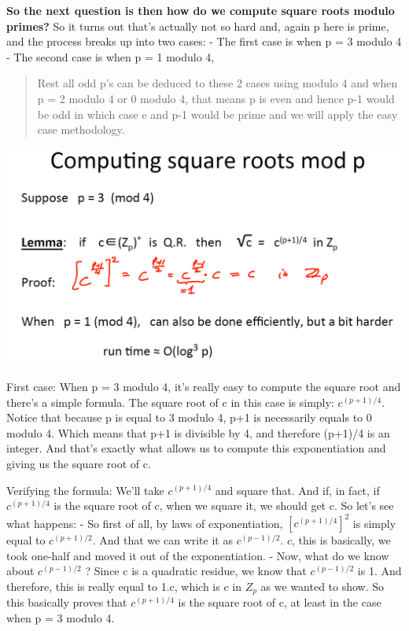 \documentclass[11pt]{article}
\makeatletter
\def\maxwidth{\ifdim\Gin@nat@width>\linewidth\linewidth
    \else\Gin@nat@width\fi}
\let\Oldincludegraphics\includegraphics
\renewcommand{\includegraphics}[1]{\Oldincludegraphics[width=.8\maxwidth]{#1}}
\makeatother
\begin{document}
\textbf{So the next question is then how do we compute square roots
modulo primes?} So it turns out that's actually not so hard and, again p
here is prime, and the process breaks up into two cases: - The first
case is when p = 3 modulo 4 - The second case is when p = 1 modulo 4,

\begin{quote}
Rest all odd p's can be deduced to these 2 cases using modulo 4 and when
p = 2 modulo 4 or 0 modulo 4, that means p is even and hence p-1 would
be odd in which case e and p-1 would be prime and we will apply the easy
case methodology.
\end{quote}

\includegraphics{./Images/NT-ComputeSqrRoot.png}

First case: When p = 3 modulo 4, it's really easy to compute the square
root and there's a simple formula. The square root of c in this case is
simply: \(c^{(p+1)/4}\). Notice that because p is equal to 3 modulo 4,
p+1 is necessarily equals to 0 modulo 4. Which means that p+1 is
divisible by 4, and therefore (p+1)/4 is an integer. And that's exactly
what allows us to compute this exponentiation and giving us the square
root of c.

Verifying the formula: We'll take \(c^{(p+1)/4}\) and square that. And
if, in fact, if \(c^{(p+1)/4}\) is the square root of c, when we square
it, we should get c. So let's see what happens: - So first of all, by
laws of exponentiation, \([c^{(p+1)/4}]^{2}\) is simply equal to
\(c^{(p+1)/2}\). And that we can write it as \(c^{(p-1)/2}\). \(c\),
this is basically, we took one-half and moved it out of the
exponentiation. - Now, what do we know about \(c^{(p-1)/2}\) ? Since c
is a quadratic residue, we know that \(c^{(p-1)/2}\) is 1. And
therefore, this is really equal to 1.c, which is c in \(Z_{p}\) as we
wanted to show. So this basically proves that \(c^{(p+1)/4}\) is the
square root of c, at least in the case when p = 3 modulo 4.
\end{document}
